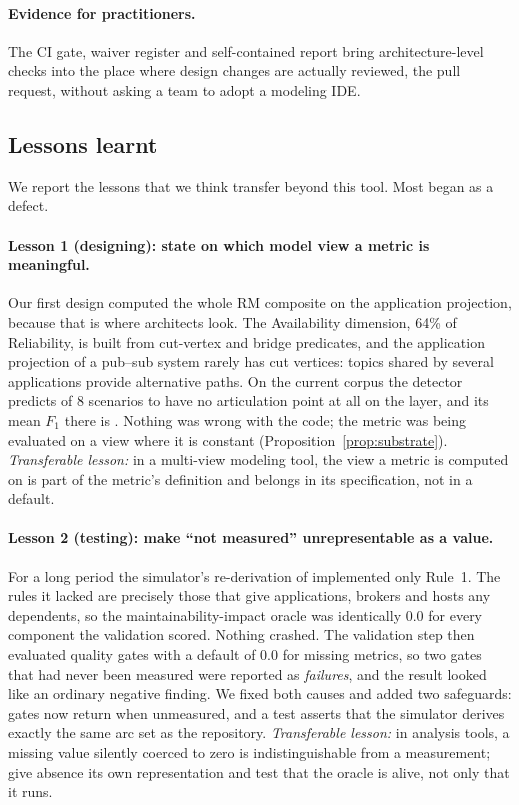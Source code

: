 \paragraph{Evidence for practitioners.} The CI gate, waiver register and self-contained report bring architecture-level checks into the place where design changes are actually reviewed, the pull request, without asking a team to adopt a modeling IDE.

\subsection{Lessons learnt}
\label{sec:lessons:list}

We report the lessons that we think transfer beyond this tool. Most began as a defect.

\paragraph{Lesson 1 (designing): state on which model view a metric is meaningful.} Our first design computed the whole RM composite on the application projection, because that is where architects look. The Availability dimension, 64\% of Reliability, is built from cut-vertex and bridge predicates, and the application projection of a pub--sub system rarely has cut vertices: topics shared by several applications provide alternative paths. On the current corpus the  detector predicts \LessonSpofZeroApp{} of 8 scenarios to have no articulation point at all on the  layer, and its mean $F_1$ there is \LessonSpofFOneApp{}. Nothing was wrong with the code; the metric was being evaluated on a view where it is constant (Proposition~\ref{prop:substrate}). \emph{Transferable lesson:} in a multi-view modeling tool, the view a metric is computed on is part of the metric's definition and belongs in its specification, not in a default.

\paragraph{Lesson 2 (testing): make ``not measured'' unrepresentable as a value.} For a long period the simulator's re-derivation of  implemented only Rule~1. The rules it lacked are precisely those that give applications, brokers and hosts any dependents, so the maintainability-impact oracle was identically 0.0 for every component the validation scored. Nothing crashed. The validation step then evaluated quality gates with a default of 0.0 for missing metrics, so two gates that had never been measured were reported as \emph{failures}, and the result looked like an ordinary negative finding. We fixed both causes and added two safeguards: gates now return  when unmeasured, and a test asserts that the simulator derives exactly the same arc set as the repository. \emph{Transferable lesson:} in analysis tools, a missing value silently coerced to zero is indistinguishable from a measurement; give absence its own representation and test that the oracle is alive, not only that it runs.

